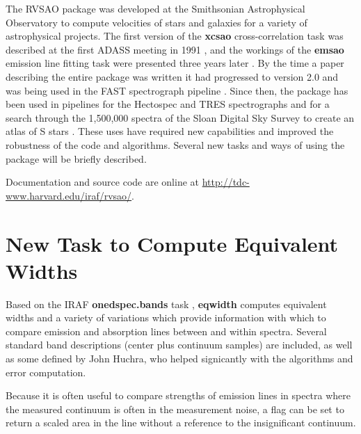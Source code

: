 The RVSAO package was developed at the Smithsonian Astrophysical Observatory to compute velocities of stars and galaxies for a variety of astrophysical projects.  The first version of the \textbf{xcsao} cross-correlation task was described at the first ADASS meeting in 1991 \citep{xcsao_1991}, and the workings of the \textbf{emsao} emission line fitting task were presented three years later \citep{1995ASPC...77..496M}. By the time a paper describing the entire package was written \citep{1998PASP..110..934K} it had progressed to version 2.0 and was being used in the FAST spectrograph pipeline \citep{1997ASPC..125..140T}.  Since then, the package has been used in pipelines for the Hectospec \citep{2007ASPC..376..249M} and TRES \citep{2011ASPC..442..305M} spectrographs and for a search through the 1,500,000 spectra of the Sloan Digital Sky Survey to create an atlas of S stars \citep{2011AAS...21715303O}.  These uses have required new capabilities and improved the robustness of the code and algorithms.  Several new tasks and ways of using the package will be briefly described.

Documentation and source code are online at \url{http://tdc-www.harvard.edu/iraf/rvsao/}.

\section{New Task to Compute Equivalent Widths}

Based on the IRAF \textbf{onedspec.bands} task \citep{1992ASPC...25..417V}, \textbf{eqwidth} computes equivalent widths and a variety of variations which provide information with which to compare emission and absorption lines between and within spectra.  Several standard band descriptions (center plus continuum samples) are included, as well as some defined by John Huchra, who helped signicantly with the algorithms and error computation.

Because it is often useful to compare strengths of emission lines in spectra where the measured continuum is often in the measurement noise, a flag can be set to return a scaled area in the line without a reference to the insignificant continuum.

